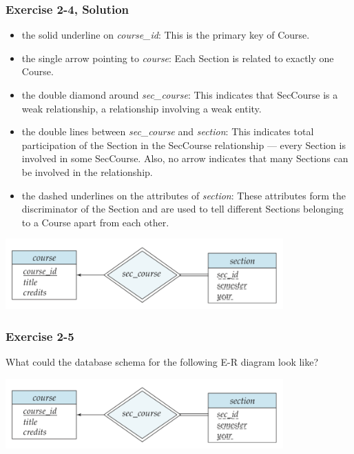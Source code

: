 \begin{frame}
\frametitle{Exercise 2-4, Solution}

\begin{itemize}
  \item the solid underline on \textit{course\_id}: This is the primary key of Course.
  \item the single arrow pointing to \textit{course}: Each Section is related to exactly one Course.
  \item the double diamond around \textit{sec\_course}: This indicates that SecCourse is a weak relationship, a relationship involving a weak entity.
  \item the double lines between \textit{sec\_course} and \textit{section}: This indicates total participation of the Section in the SecCourse relationship --- every Section is involved in some SecCourse. Also, no arrow indicates that many Sections can be involved in the relationship.
  \item the dashed underlines on the attributes of \textit{section}: These attributes form the discriminator of the Section and are used to tell different Sections belonging to a Course apart from each other.
\end{itemize}

\begin{center}
  \includegraphics[width=0.8\textwidth]{images/weak-entity-set}
\end{center}

\end{frame}


\begin{frame}
\frametitle{Exercise 2-5}

What could the database schema for the following E-R diagram look like?

\begin{center}
  \includegraphics[width=0.8\textwidth]{images/weak-entity-set}
\end{center}

\end{frame}


